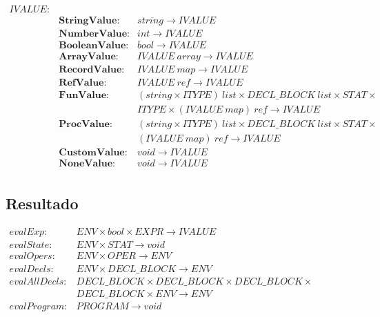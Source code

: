 {
\fontsize{9pt}{10}\selectfont
\ttfamily
$
\begin{array}{llll}
IVALUE:	&\\
		&\textbf{StringValue:}	&string \rightarrow IVALUE\\
		&\textbf{NumberValue:}	&int \rightarrow IVALUE\\
		&\textbf{BooleanValue:}	&bool \rightarrow IVALUE\\
		&\textbf{ArrayValue:}	&IVALUE~array \rightarrow IVALUE\\
		&\textbf{RecordValue:}	&IVALUE~map \rightarrow IVALUE\\
		&\textbf{RefValue:}		&IVALUE~ref \rightarrow IVALUE\\
		&\textbf{FunValue:}		&(string \times ITYPE)~list \times DECL\_BLOCK~list \times STAT \times \\
		&&ITYPE \times (IVALUE~map)~ref \rightarrow IVALUE\\
		&\textbf{ProcValue}:	&(string \times ITYPE)~list \times DECL\_BLOCK~list \times STAT \times \\
		&&(IVALUE~map)~ref \rightarrow IVALUE\\
		&\textbf{CustomValue}:	&void \rightarrow IVALUE\\
		&\textbf{NoneValue}:	&void \rightarrow IVALUE\\
\end{array}
$
}\\

\subsection{Resultado}

{
\fontsize{9pt}{10}\selectfont
\ttfamily
$
\begin{array}{lll}
evalExp:		&ENV \times bool \times EXPR \rightarrow IVALUE\\
evalState:		&ENV \times STAT \rightarrow void\\
evalOpers:		&ENV \times	OPER \rightarrow ENV\\
evalDecls:		&ENV \times DECL\_BLOCK \rightarrow ENV\\
evalAllDecls:	&DECL\_BLOCK \times DECL\_BLOCK \times DECL\_BLOCK \times \\
				&DECL\_BLOCK \times ENV \rightarrow ENV\\
evalProgram:	&PROGRAM \rightarrow void\\
\end{array}
$
}\\

